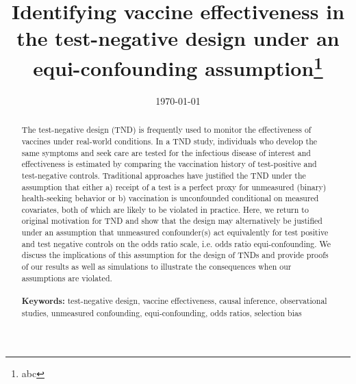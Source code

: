 \documentclass[11pt]{article}
\begin{document}
\begin{titlepage}
\title{Identifying vaccine effectiveness in the test-negative design under an equi-confounding assumption\thanks{abc}}
\author[1]{ }
\date{\today}
\maketitle

\begin{abstract}
   The test-negative design (TND) is frequently used to monitor the effectiveness of vaccines under real-world conditions. In a TND study, individuals who develop the same symptoms and seek care are tested for the infectious disease of interest and effectiveness is estimated by comparing the vaccination history of test-positive and test-negative controls. Traditional approaches have justified the TND under the assumption that either a) receipt of a test is a perfect proxy for unmeasured (binary) health-seeking behavior or b) vaccination is unconfounded conditional on measured covariates, both of which are likely to be violated in practice. Here, we return to original motivation for TND and show that the design may alternatively be justified under an assumption that unmeasured confounder(s) act equivalently for test positive and test negative controls on the odds ratio scale, i.e. odds ratio equi-confounding. We discuss the implications of this assumption for the design of TNDs and provide proofs of our results as well as simulations to illustrate the consequences when our assumptions are violated.
\noindent \\
\vspace{0in} \\
\noindent\textbf{Keywords:} test-negative design, vaccine effectiveness, causal inference, observational studies, unmeasured confounding, equi-confounding, odds ratios, selection bias
\bigskip
\end{abstract}
\setcounter{page}{0}
\thispagestyle{empty}
\end{titlepage}
\pagebreak \newpage

\doublespacing
\end{document}
